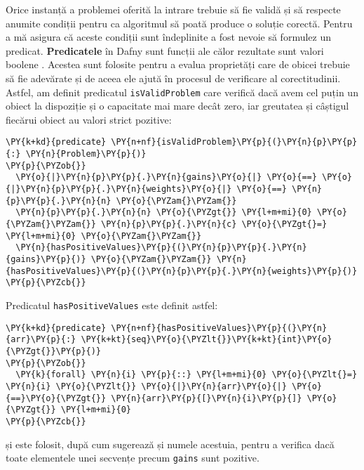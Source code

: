 \begin{sloppypar}
Orice instanță a problemei oferită la intrare trebuie să fie validă și să respecte anumite condiții pentru ca algoritmul să poată produce o soluție corectă. Pentru a mă asigura că aceste condiții sunt îndeplinite a fost nevoie să formulez un predicat. \textbf{Predicatele} în Dafny sunt funcții ale călor rezultate sunt valori boolene \cite{leino2021dafny}. Acestea sunt folosite pentru a evalua proprietăți care de obicei trebuie să fie adevărate și de aceea ele ajută în procesul de verificare al corectitudinii. Astfel, am definit predicatul \texttt{isValidProblem} care verifică dacă avem cel puțin un obiect la dispoziție și o capacitate mai mare decât zero, iar greutatea și câștigul fiecărui obiect au valori strict pozitive:
    \begin{Verbatim}[commandchars=\\\{\}]
\PY{k+kd}{predicate} \PY{n+nf}{isValidProblem}\PY{p}{(}\PY{n}{p}\PY{p}{:} \PY{n}{Problem}\PY{p}{)}
\PY{p}{\PYZob{}}
  \PY{o}{|}\PY{n}{p}\PY{p}{.}\PY{n}{gains}\PY{o}{|} \PY{o}{==} \PY{o}{|}\PY{n}{p}\PY{p}{.}\PY{n}{weights}\PY{o}{|} \PY{o}{==} \PY{n}{p}\PY{p}{.}\PY{n}{n} \PY{o}{\PYZam{}\PYZam{}} 
  \PY{n}{p}\PY{p}{.}\PY{n}{n} \PY{o}{\PYZgt{}} \PY{l+m+mi}{0} \PY{o}{\PYZam{}\PYZam{}} \PY{n}{p}\PY{p}{.}\PY{n}{c} \PY{o}{\PYZgt{}=} \PY{l+m+mi}{0} \PY{o}{\PYZam{}\PYZam{}} 
  \PY{n}{hasPositiveValues}\PY{p}{(}\PY{n}{p}\PY{p}{.}\PY{n}{gains}\PY{p}{)} \PY{o}{\PYZam{}\PYZam{}} \PY{n}{hasPositiveValues}\PY{p}{(}\PY{n}{p}\PY{p}{.}\PY{n}{weights}\PY{p}{)} 
\PY{p}{\PYZcb{}}
\end{Verbatim}
\par Predicatul \texttt{hasPositiveValues} este definit astfel:
    \begin{Verbatim}[commandchars=\\\{\}]
\PY{k+kd}{predicate} \PY{n+nf}{hasPositiveValues}\PY{p}{(}\PY{n}{arr}\PY{p}{:} \PY{k+kt}{seq}\PY{o}{\PYZlt{}}\PY{k+kt}{int}\PY{o}{\PYZgt{}}\PY{p}{)}
\PY{p}{\PYZob{}}
  \PY{k}{forall} \PY{n}{i} \PY{p}{::} \PY{l+m+mi}{0} \PY{o}{\PYZlt{}=} \PY{n}{i} \PY{o}{\PYZlt{}} \PY{o}{|}\PY{n}{arr}\PY{o}{|} \PY{o}{==}\PY{o}{\PYZgt{}} \PY{n}{arr}\PY{p}{[}\PY{n}{i}\PY{p}{]} \PY{o}{\PYZgt{}} \PY{l+m+mi}{0}
\PY{p}{\PYZcb{}}
\end{Verbatim}
    și este folosit, după cum sugerează și numele acestuia, pentru a verifica dacă toate elementele unei secvențe precum \texttt{gains} sunt pozitive. \\ \par 


\end{sloppypar}
